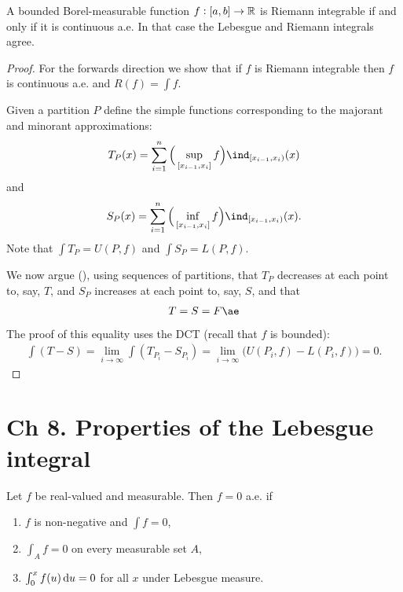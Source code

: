 \begin{theorem*}
  A bounded Borel-measurable function $f:[a, b]\to\mathbb{R}$ is Riemann integrable if and only if it is continuous
  a.e. In that case the Lebesgue and Riemann integrals agree.
\end{theorem*}

\begin{proof}
  For the forwards direction we show that if $f$ is Riemann integrable then $f$ is continuous a.e.
  and $R(f) = \int f$.

  Given a partition $P$ define the simple functions corresponding to the majorant and minorant approximations:
  \begin{align*}
    T_P(x) = \sum_{i=1}^n \Big(\sup_{[x_{i-1}, x_i]} f\Big)\ind_{[x_{i-1}, x_i)}(x)
  \end{align*}
  and
  \begin{align*}
    S_P(x) = \sum_{i=1}^n \Big(\inf_{[x_{i-1}, x_i]} f\Big)\ind_{[x_{i-1}, x_i)}(x).
  \end{align*}
  Note that $\int T_P = U(P, f)$ and $\int S_P = L(P, f)$.

  We now argue (), using sequences of partitions, that $T_P$ decreases at each point to, say, $T$, and
  $S_P$ increases at each point to, say, $S$, and that
  \begin{align*}
    T = S = F \ae
  \end{align*}
  The proof of this equality uses the DCT (recall that $f$ is bounded):
  \begin{align*}
    \int (T - S) = \lim_{i \to \infty} \int (T_{P_i} - S_{P_i}) = \lim_{i\to\infty} \big(U(P_i, f) - L(P_i, f)\big) = 0.
  \end{align*}
\end{proof}

\section{Ch 8. Properties of the Lebesgue integral}

\begin{theorem}[conditions for $f = 0$ a.e.]
  Let $f$ be real-valued and measurable. Then $f = 0$ a.e. if
  \begin{enumerate}
  \item $f$ is non-negative and $\int f = 0$,
  \item $\int_A f = 0$ on every measurable set $A$,
  \item $\int_0^x f(u) \du = 0$ for all $x$ under Lebesgue measure.
  \end{enumerate}
\end{theorem}

